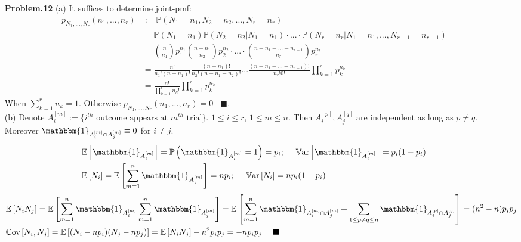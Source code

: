 \documentclass[a4paper, 11pt]{article}
\begin{document}
\begin{itemize}
	\item[\textbf{Problem.12}] (a) It suffices to determine joint-pmf:
	\begin{equation}
		\begin{split}
			p_{N_1, ..., N_r}(n_1, ..., n_r)&:=\mathbb{P}\left(N_1=n_1, N_2=n_2, ..., N_r=n_r\right)\\
			&=\mathbb{P}\left(N_1=n_1\right) \mathbb{P}\left(N_2=n_2 | N_1=n_1\right)\cdot...\cdot\mathbb{P}\left(N_r=n_r|N_1=n_1,...,N_{r-1}=n_{r-1}\right)\\
			&=\binom{n}{n_1}p_1^{n_1}\binom{n-n_1}{n_2}p_2^{n_2}\cdot ...\cdot \binom{n-n_1-...-n_{r-1}}{n_r}p_r^{n_r}\\
			&=\frac{n!}{n_1!(n-n_1)!}\frac{(n-n_1)!}{n_2!(n-n_1-n_2)!}...\frac{(n-n_1-...-n_{r-1})!}{n_{r}!0!}\prod_{k=1}^r p_{k}^{n_k}\\
			&=\frac{n!}{\prod_{k=1}^r n_k!}\prod_{k=1}^r p_{k}^{n_k}
		\end{split}
	\end{equation}
	When $\sum_{k=1}^r n_k=1$. Otherwise $p_{N_1, ..., N_r}(n_1, ..., n_r)=0~~~~\blacksquare$.\\
	(b) Denote $A_i^{[m]}:=\{\text{$i^{th}$ outcome appears at $m^{th}$ trial}\}$. $1\leq i\leq r$, $1\leq m \leq n$. Then $A_i^{[p]}, A_j^{[q]}$ are independent as long as $p\ne q$. Moreover $\mathbbm{1}_{A_i^{[m]}\cap A_j^{[m]}}\equiv0$ for $i\ne j$.
	\begin{equation}
		\begin{split}
			&\mathbb{E}\left[\mathbbm{1}_{A_i^{[m]}}\right]=\mathbb{P}\left(\mathbbm{1}_{A_i^{[m]}}=1\right)=p_i;~~~~\mathrm{\mathbb{V}ar}\left[\mathbbm{1}_{A_i^{[m]}}\right]=p_i(1-p_i)\\
			&\mathbb{E}\left[N_i\right] = \mathbb{E}\left[\sum_{m=1}^n \mathbbm{1}_{A_i^{[m]}}\right] = np_i;~~~~\mathrm{\mathbb{V}ar}\left[N_i\right] = np_i(1-p_i)
		\end{split}
	\end{equation}
	\begin{equation}
		\begin{split}
			&\mathbb{E}\left[N_iN_j\right]=\mathbb{E}\left[\sum_{m=1}^n \mathbbm{1}_{A_i^{[m]}}\sum_{m=1}^n \mathbbm{1}_{A_j^{[m]}}\right]=\mathbb{E}\left[\sum_{m=1}^n \mathbbm{1}_{A_i^{[m]}\cap A_j^{[m]}}+\sum_{1 \leq p\ne q \leq n} \mathbbm{1}_{A_i^{[p]}\cap A_j^{[q]}}\right]=(n^2-n)p_ip_j\\
			&\mathrm{\mathbb{C}ov}\left[N_i,N_j\right]=\mathbb{E}\left[(N_i-np_i)(N_j-np_j)\right]=\mathbb{E}\left[N_iN_j\right]-n^2p_ip_j=-np_ip_j~~~~\blacksquare

\end{split}
\end{equation}
\end{itemize}
\end{document}
